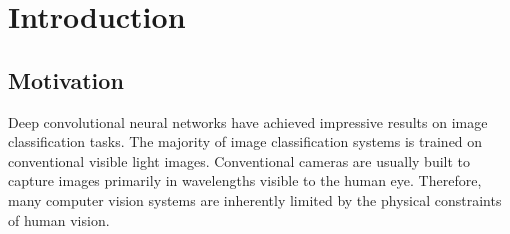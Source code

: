 \documentclass{l4proj}
\begin{document}
\tableofcontents

%
%
%
%
%
%
%
\chapter{Introduction}




\section{Motivation}

Deep convolutional neural networks have achieved impressive results on image classification tasks. The majority of image classification systems is trained on conventional visible light images. Conventional cameras are usually built to capture images primarily in wavelengths visible to the human eye. Therefore, many computer vision systems are inherently limited by the physical constraints of human vision. 
\end{document}
